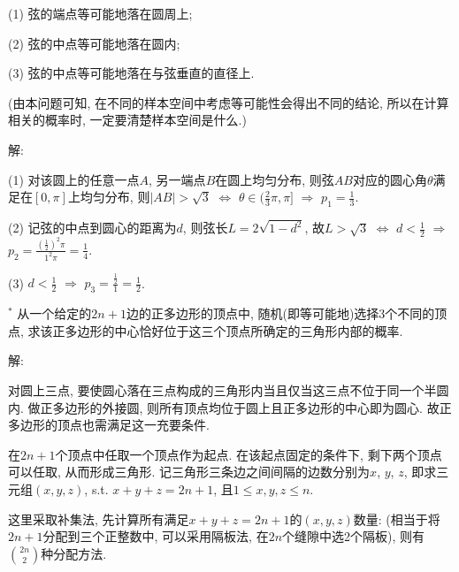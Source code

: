 \documentclass[standard]{ExBook}
\renewenvironment{shaded}{%
  \def\FrameCommand{\fboxsep=\FrameSep \colorbox{shadecolor}}%
  \MakeFramed{\advance\hsize-\width \FrameRestore}%
}{%
  \endMakeFramed
}
\begin{document}
\begin{qitems}
\begin{bbox}
\begin{shaded}
(1) 弦的端点等可能地落在圆周上;

(2) 弦的中点等可能地落在圆内;

(3) 弦的中点等可能地落在与弦垂直的直径上.

(由本问题可知, 在不同的样本空间中考虑等可能性会得出不同的结论, 所以在计算相关的概率时, 一定要清楚样本空间是什么.)
    \end{shaded}
    \end{bbox}

\vspace{\dimexpr2.5cm-5em\relax}

解:

(1) 对该圆上的任意一点$A$, 另一端点$B$在圆上均匀分布, 则弦$AB$对应的圆心角$\theta$满足在$[0,\pi]$上均匀分布, 则$|AB| > \sqrt{3}$ $\Longleftrightarrow$ $\theta \in (\frac{2}{3}\pi,\pi]$ $\Longrightarrow$ $p_{1}=\frac{1}{3}$.

(2) 记弦的中点到圆心的距离为$d$, 则弦长$L=2\sqrt{1-d^2}$, 故$L > \sqrt{3}$ $\Longleftrightarrow$ $d < \frac{1}{2}$ $\Longrightarrow$ $p_{2}=\frac{(\frac{1}{2})^2\pi}{1^2\pi}=\frac{1}{4}$.

(3) $d < \frac{1}{2}$ $\Longrightarrow$ $p_{3}=\frac{\frac{1}{2}}{1}=\frac{1}{2}$.

\vspace{2.5cm-5em}

    \begin{bbox}
    \begin{shaded}
        \qitem$^*$
从一个给定的$2n + 1$边的正多边形的顶点中, 随机(即等可能地)选择3个不同的顶点, 求该正多边形的中心恰好位于这三个顶点所确定的三角形内部的概率.
    \end{shaded}
    \end{bbox}

\vspace{\dimexpr2.5cm-5em\relax}

解:

对圆上三点, 要使圆心落在三点构成的三角形内当且仅当这三点不位于同一个半圆内. 做正多边形的外接圆, 则所有顶点均位于圆上且正多边形的中心即为圆心. 故正多边形的顶点也需满足这一充要条件.

在$2n+1$个顶点中任取一个顶点作为起点. 在该起点固定的条件下, 剩下两个顶点可以任取, 从而形成三角形. 记三角形三条边之间间隔的边数分别为$x$, $y$, $z$, 即求三元组$(x,y,z)$, s.t. $x+y+z=2n+1$, 且$1\leq x,y,z\leq n$. 

这里采取补集法, 先计算所有满足$x+y+z=2n+1$的$(x,y,z)$数量: (相当于将$2n+1$分配到三个正整数中, 可以采用隔板法, 在$2n$个缝隙中选2个隔板), 则有$\binom{2n}{2}$种分配方法.


\end{qitems}
\end{document}
